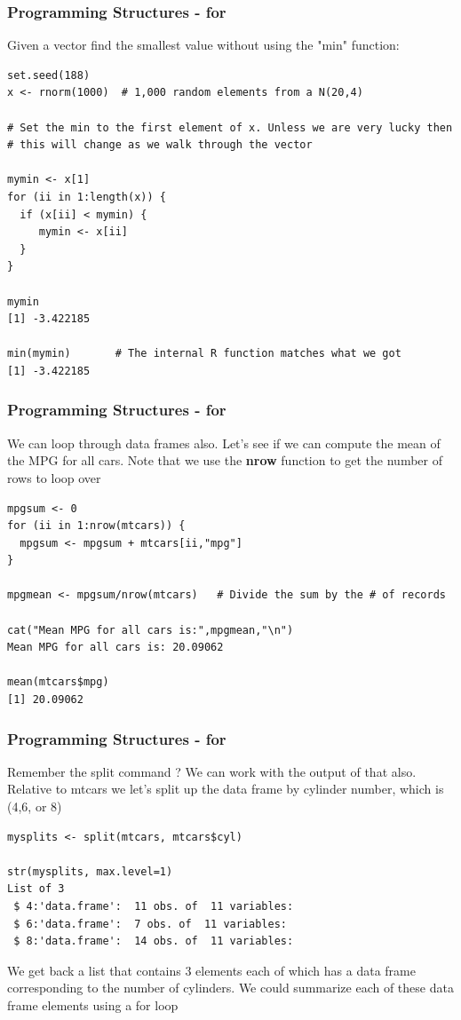 \documentclass{beamer}
\begin{document}
\begin{frame}[fragile]
\frametitle{Programming Structures - for }
Given a vector find the smallest value without using the "min" function:
\footnotesize
\begin{verbatim}
set.seed(188)
x <- rnorm(1000)  # 1,000 random elements from a N(20,4)

# Set the min to the first element of x. Unless we are very lucky then 
# this will change as we walk through the vector

mymin <- x[1] 
for (ii in 1:length(x)) {
  if (x[ii] < mymin) {
     mymin <- x[ii]
  }
}

mymin
[1] -3.422185
 
min(mymin)       # The internal R function matches what we got
[1] -3.422185

\end{verbatim}
\end{frame}

%

\begin{frame}[fragile]
\frametitle{Programming Structures - for }
We can loop through data frames also. Let's see if we can compute the mean of the MPG for all cars. Note that we use the \textbf{nrow} function to get the number of rows to loop over 
\footnotesize
\begin{verbatim}
mpgsum <- 0
for (ii in 1:nrow(mtcars)) {
  mpgsum <- mpgsum + mtcars[ii,"mpg"]
}

mpgmean <- mpgsum/nrow(mtcars)   # Divide the sum by the # of records

cat("Mean MPG for all cars is:",mpgmean,"\n")
Mean MPG for all cars is: 20.09062 

mean(mtcars$mpg)
[1] 20.09062

\end{verbatim}
\end{frame}

%

\begin{frame}[fragile]
\frametitle{Programming Structures - for }
Remember the split command ? We can work with the output of that also. Relative to mtcars we let's split up the data frame by cylinder number, which is (4,6, or 8)
\footnotesize
\begin{verbatim}
mysplits <- split(mtcars, mtcars$cyl)

str(mysplits, max.level=1)
List of 3
 $ 4:'data.frame':  11 obs. of  11 variables:
 $ 6:'data.frame':	7 obs. of  11 variables:
 $ 8:'data.frame':	14 obs. of  11 variables:
\end{verbatim}
\normalsize
We get back a list that contains 3 elements each of which has a data frame corresponding to the number of cylinders. We could summarize each of these data frame elements using a for loop
\end{frame}
\end{document}
